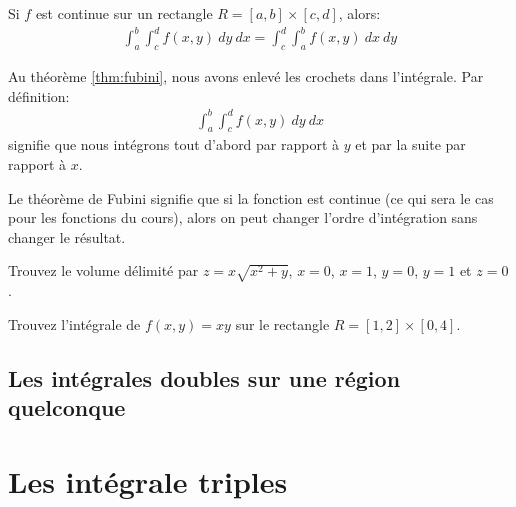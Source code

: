 \documentclass[]{book}
\theoremstyle{definition}
\theoremstyle{definition}
\theoremstyle{definition}
\theoremstyle{remark}
\let\BeginKnitrBlock\begin \let\EndKnitrBlock\end
\begin{document}
\BeginKnitrBlock{theorem}[Fubini]
\protect\hypertarget{thm:fubini}{}{\label{thm:fubini} {} }Si \(f\) est continue sur un rectangle \(R=[a,b]\times[c,d]\),
alors: \begin{align*}
\int_a^b\int_c^df(x,y)\ dy\ dx=\int_c^d\int_a^bf(x,y)\ dx\ dy
\end{align*}
\EndKnitrBlock{theorem}

Au théorème \ref{thm:fubini}, nous avons enlevé les crochets dans
l'intégrale. Par définition: \begin{align*}
\int_a^b\int_c^df(x,y)\ dy\ dx
\end{align*} signifie que nous intégrons tout d'abord par rapport à
\(y\) et par la suite par rapport à \(x\).

Le théorème de Fubini signifie que si la fonction est continue (ce qui
sera le cas pour les fonctions du cours), alors on peut changer l'ordre
d'intégration sans changer le résultat. \BeginKnitrBlock{example}

\protect\hypertarget{exm:unnamed-chunk-243}{}{\label{exm:unnamed-chunk-243}
}Trouvez le volume délimité par \(z=x\sqrt{x^2+y}\), \(x=0\), \(x=1\),
\(y=0\), \(y=1\) et \(z=0\).
\EndKnitrBlock{example}
\vspace*{8cm}

\BeginKnitrBlock{example}
\protect\hypertarget{exm:unnamed-chunk-244}{}{\label{exm:unnamed-chunk-244}
}Trouvez l'intégrale de \(f(x,y)=xy\) sur le rectangle
\(R=[1,2]\times[0,4]\).
\EndKnitrBlock{example}
\vspace*{8cm}

\hypertarget{les-integrales-doubles-sur-une-region-quelconque}{%
\subsection{Les intégrales doubles sur une région
quelconque}\label{les-integrales-doubles-sur-une-region-quelconque}}

\hypertarget{les-integrale-triples}{%
\section{Les intégrale triples}\label{les-integrale-triples}}


\end{document}
